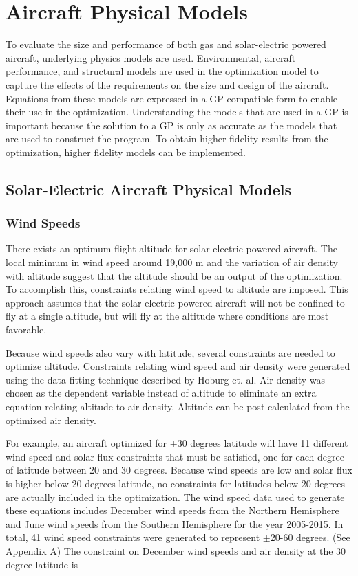\section{Aircraft Physical Models}

To evaluate the size and performance of both gas and solar-electric powered aircraft, underlying physics models are used.  
Environmental, aircraft performance, and structural models are used in the optimization model to capture the effects of the requirements on the size and design of the aircraft.
Equations from these models are expressed in a GP-compatible form to enable their use in the optimization. 
Understanding the models that are used in a GP is important because the solution to a GP is only as accurate as the models that are used to construct the program.  
To obtain higher fidelity results from the optimization, higher fidelity models can be implemented. 

\subsection{Solar-Electric Aircraft Physical Models}

\subsubsection{Wind Speeds}

There exists an optimum flight altitude for solar-electric powered aircraft.  
The local minimum in wind speed around 19,000 m and the variation of air density with altitude suggest that the altitude should be an output of the optimization. 
To accomplish this, constraints relating wind speed to altitude are imposed. 
This approach assumes that the solar-electric powered aircraft will not be confined to fly at a single altitude, but will fly at the altitude where conditions are most favorable.

Because wind speeds also vary with latitude, several constraints are needed to optimize altitude. 
Constraints relating wind speed and air density were generated using the data fitting technique described by Hoburg et. al\cite{fitting}.
Air density was chosen as the dependent variable instead of altitude to eliminate an extra equation relating altitude to air density. 
Altitude can be post-calculated from the optimized air density. 

For example, an aircraft optimized for $\pm$30 degrees latitude will have 11 different wind speed and solar flux constraints that must be satisfied, one for each degree of latitude between 20 and 30 degrees. 
Because wind speeds are low and solar flux is higher below 20 degrees latitude, no constraints for latitudes below 20 degrees are actually included in the optimization. 
The wind speed data used to generate these equations includes December wind speeds from the Northern Hemisphere and June wind speeds from the Southern Hemisphere for the year 2005-2015.
In total, 41 wind speed constraints were generated to represent $\pm$20-60 degrees. (See Appendix A) 
The constraint on December wind speeds and air density at the 30 degree latitude is 

